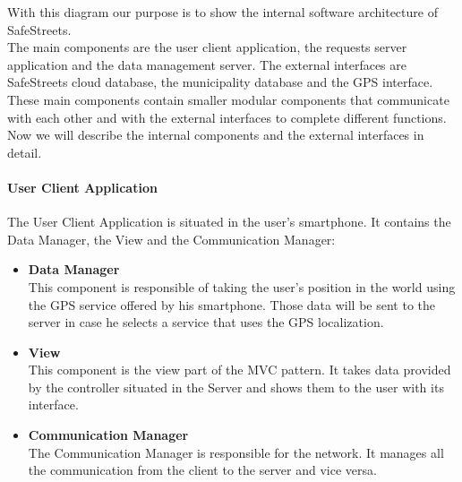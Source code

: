 \documentclass[titlepage]{article}
\begin{document}
With this diagram our purpose is to show the internal software architecture of SafeStreets. \\
The main components are the user client application, the requests server application and the data management server. The external interfaces are SafeStreets cloud database, the municipality database and the GPS interface.\\
These main components contain smaller modular components that communicate with each other and with the external interfaces to complete different functions.\\
Now we will describe the internal components and the external interfaces in detail. \\

\paragraph{\textbf{User Client Application}}
The User Client Application is situated in the user's smartphone. It contains the Data Manager, the View and the Communication Manager:
\begin{itemize}
\item \textbf{Data Manager}\\
This component is responsible of taking the user's position in the world using the GPS service offered by his smartphone. Those data will be sent to the server in case he selects a service that uses the GPS localization. \\
\item \textbf{View}\\
This component is the view part of the MVC pattern. It takes data provided by the controller situated in the Server and shows them to the user with its interface.
\item \textbf{Communication Manager}\\
The Communication Manager is responsible for the network.
It manages all the communication from the client to the server and vice versa.\\
\end{itemize}
\end{document}
